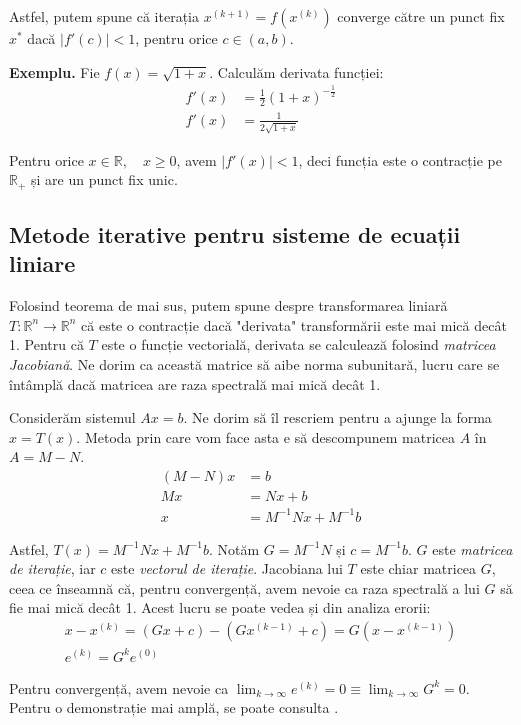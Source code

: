 \documentclass{exam}
\begin{document}
Astfel, putem spune că iterația $x^{(k+1)} = f(x^{(k)})$ converge către un
punct fix $x^*$ dacă $|f'(c)| < 1$, pentru orice $c \in (a, b)$.

\textbf{Exemplu.} Fie $f(x) = \sqrt{1 + x}$. Calculăm derivata funcției:
\begin{align*}
	f'(x) & = \frac{1}{2} (1 + x)^{-\frac{1}{2}} \\
	f'(x) & = \frac{1}{2 \sqrt{1 + x}}
\end{align*}

Pentru orice $x \in \mathbb{R}, \quad x \geq 0$, avem $|f'(x)| < 1$, deci
funcția este o contracție pe $\mathbb{R}_+$ și are un punct fix unic.

\subsection{Metode iterative pentru sisteme de ecuații liniare}

Folosind teorema de mai sus, putem spune despre transformarea liniară
$T : \mathbb{R}^n \rightarrow \mathbb{R}^n$ că este o contracție dacă
"derivata" transformării este mai mică decât 1. Pentru că $T$ este o funcție
vectorială, derivata se calculează folosind \textit{matricea Jacobiană}. Ne
dorim ca această matrice să aibe norma subunitară, lucru care se întâmplă dacă
matricea are raza spectrală mai mică decât 1.

Considerăm sistemul $Ax = b$. Ne dorim să îl rescriem pentru a ajunge la forma
$x = T(x)$. Metoda prin care vom face asta e să descompunem matricea $A$ în
$A = M - N$.
\begin{align*}
	(M - N)x & = b                  \\
	Mx       & = Nx + b             \\
	x        & = M^{-1}Nx + M^{-1}b
\end{align*}

Astfel, $T(x) = M^{-1}Nx + M^{-1}b$. Notăm $G = M^{-1}N$ și $c = M^{-1}b$. $G$
este \textit{matricea de iterație}, iar $c$ este \textit{vectorul de iterație}.
Jacobiana lui $T$ este chiar matricea $G$, ceea ce înseamnă că, pentru
convergență, avem nevoie ca raza spectrală a lui $G$ să fie mai mică decât 1.
Acest lucru se poate vedea și din analiza erorii:
\begin{gather*}
	x - x^{(k)} = (Gx + c) - (Gx^{(k - 1)} + c) = G(x - x^{(k - 1)}) \\
	e^{(k)} = G^k e^{(0)}
\end{gather*}

Pentru convergență, avem nevoie ca $\lim_{k \to \infty} e^{(k)} = 0 \equiv \lim_{k \to \infty} G^k = 0$.
Pentru o demonstrație mai amplă, se poate consulta \cite{Hansen}.
\end{document}
